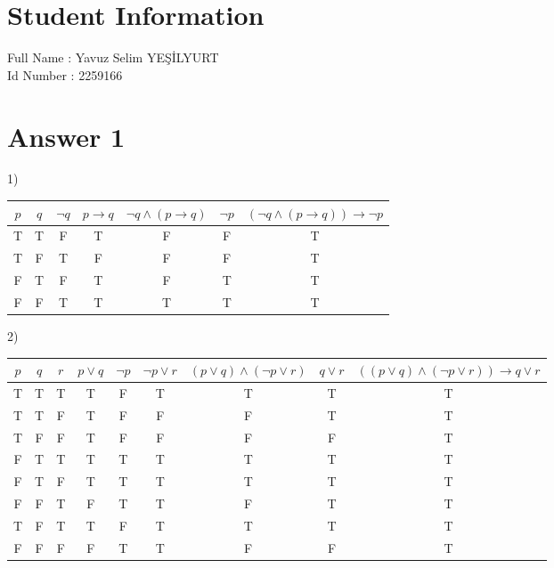 \documentclass[12pt]{article}
\begin{document}
\section*{Student Information } 
Full Name : Yavuz Selim YEŞİLYURT \\
Id Number : 2259166 \\

\section*{Answer 1}
\hspace{5mm} 1)\\
\begin{table}[H]
\small
\centering
\begin{tabular}{|c|c|c|c|c|c|c|}	
\hline
$p$ & $q$ & $\neg q$ & $p\rightarrow q$ & $\neg q\wedge(p \rightarrow q)$ & $\neg p$ & $ (\neg q\wedge(p \rightarrow q)) \rightarrow \neg p$\\
\hline 
T & T & F & T & F & F & T\\			
T & F & T & F & F & F & T\\
F & T & F & T & F & T & T\\
F & F & T & T & T & T & T\\
\hline 
\end{tabular}
\end{table}
2)\\
\begin{table}[H]
\small
\centering
\begin{tabular}{|c|c|c|c|c|c|c|c|c|}	
\hline
$p$ & $q$ & $r$ & $p \vee q$ & $\neg p$ & $\neg p \vee r$ & $(p \vee q) \wedge (\neg p \vee r) $ & $q \vee r$ & $((p \vee q) \wedge (\neg p \vee r)) \rightarrow q \vee r$\\
\hline 
T & T & T & T & F & T & T & T & T\\			
T & T & F & T & F & F & F & T & T\\			
T & F & F & T & F & F & F & F & T\\			
F & T & T & T & T & T & T & T & T\\		
F & T & F & T & T & T & T & T & T\\			
F & F & T & F & T & T & F & T & T\\			
T & F & T & T & F & T & T & T & T\\			
F & F & F & F & T & T & F & F &T\\		
\hline 
\end{tabular}
\end{table}
\end{document}
